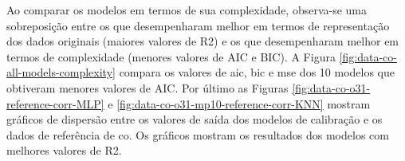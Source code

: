 Ao comparar os modelos em termos de sua complexidade, observa-se uma sobreposição entre os que desempenharam melhor em termos de representação dos dados originais (maiores valores de R2) e os que desempenharam melhor em termos de complexidade (menores valores de AIC e BIC). A Figura \ref{fig:data-co-all-models-complexity} compara os valores de \acrshort{aic}, \acrshort{bic} e \acrshort{mse} dos 10 modelos que obtiveram menores valores de AIC. Por último as Figuras \ref{fig:data-co-o31-reference-corr-MLP} e \ref{fig:data-co-o31-mp10-reference-corr-KNN} mostram gráficos de dispersão entre os valores de saída dos modelos de calibração e os dados de referência de \acrshort{co}. Os gráficos mostram os resultados dos modelos com melhores valores de R2.